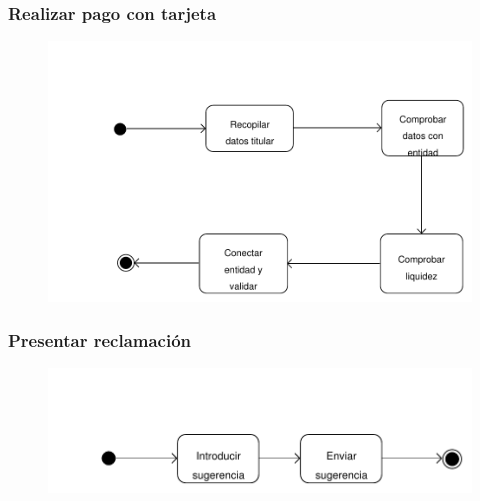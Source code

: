 \documentclass[11pt, a4paper, twoside, titlepage]{article}
\begin{document}
			\subsubsection{Realizar pago con tarjeta}
				\begin{figure}[H]\centering
					\includegraphics[scale=.7]{diagramas/da_pagotarjeta.pdf}
				\end{figure}

			\subsubsection{Presentar reclamación}
				\begin{figure}[H]\centering
					\includegraphics[scale=.82]{diagramas/da_presentarreclamacion.pdf}
				\end{figure}
\end{document}
